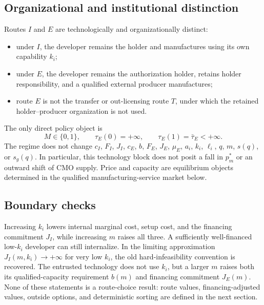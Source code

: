 \subsection{Organizational and institutional distinction}
\label{subsec:p03-organization}

Routes \(I\) and \(E\) are technologically and organizationally distinct:
\begin{itemize}
  \item under \(I\), the developer remains the holder and manufactures using
  its own capability \(k_i\);
  \item under \(E\), the developer remains the authorization holder, retains
  holder responsibility, and a qualified external producer manufactures;
  \item route \(E\) is not the transfer or out-licensing route \(T\), under
  which the retained holder--producer organization is not used.
\end{itemize}

The only direct policy object is
\begin{equation}
  M\in\{0,1\},
  \qquad
  \tau_E(0)=+\infty,
  \qquad
  \tau_E(1)=\bar\tau_E<+\infty.
  \label{eq:p03-policy-invariance}
\end{equation}
The regime does not change \(c_I\), \(F_I\), \(J_I\), \(c_E\),
\(b\), \(F_E\), \(J_E\), \(\mu_E\), \(a_i\), \(k_i\), \(\ell_i\), \(q\), \(m\), \(s(q)\), or
\(s_g(q)\). In particular, this technology block does not posit a fall in
\(p_m^*\) or an outward shift of CMO supply. Price and capacity are equilibrium
objects determined in the qualified manufacturing-service market below.

\subsection{Boundary checks}
\label{subsec:p03-boundaries}

Increasing \(k_i\) lowers internal marginal cost, setup cost, and the
financing commitment \(J_I\), while increasing \(m\) raises all three.
A sufficiently well-financed low-\(k_i\) developer can still internalize. In
the limiting approximation \(J_I(m,k_i)\to+\infty\) for very low \(k_i\), the
old hard-infeasibility convention is recovered. The entrusted technology does
not use \(k_i\), but a larger \(m\) raises both its qualified-capacity
requirement \(b(m)\) and financing commitment \(J_E(m)\). None of these
statements is a route-choice result: route values, financing-adjusted values,
outside options, and deterministic sorting are defined in the next section.
